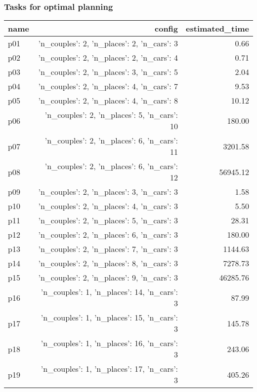 \documentclass{article}
\begin{document}
                                \subsubsection*{Tasks for optimal planning}
                                
                            \begin{center}
                            \scriptsize
                            \begin{tabular}{@{}l|r|r@{}}
                            name & config & estimated\_time\\\midrule
                              p01&{'n\_couples': 2, 'n\_places': 2, 'n\_cars': 3}&0.66\\
  p02&{'n\_couples': 2, 'n\_places': 2, 'n\_cars': 4}&0.71\\
  p03&{'n\_couples': 2, 'n\_places': 3, 'n\_cars': 5}&2.04\\
  p04&{'n\_couples': 2, 'n\_places': 4, 'n\_cars': 7}&9.53\\
  p05&{'n\_couples': 2, 'n\_places': 4, 'n\_cars': 8}&10.12\\
  p06&{'n\_couples': 2, 'n\_places': 5, 'n\_cars': 10}&180.00\\
  p07&{'n\_couples': 2, 'n\_places': 6, 'n\_cars': 11}&3201.58\\
  p08&{'n\_couples': 2, 'n\_places': 6, 'n\_cars': 12}&56945.12\\
  p09&{'n\_couples': 2, 'n\_places': 3, 'n\_cars': 3}&1.58\\
  p10&{'n\_couples': 2, 'n\_places': 4, 'n\_cars': 3}&5.50\\
  p11&{'n\_couples': 2, 'n\_places': 5, 'n\_cars': 3}&28.31\\
  p12&{'n\_couples': 2, 'n\_places': 6, 'n\_cars': 3}&180.00\\
  p13&{'n\_couples': 2, 'n\_places': 7, 'n\_cars': 3}&1144.63\\
  p14&{'n\_couples': 2, 'n\_places': 8, 'n\_cars': 3}&7278.73\\
  p15&{'n\_couples': 2, 'n\_places': 9, 'n\_cars': 3}&46285.76\\
  p16&{'n\_couples': 1, 'n\_places': 14, 'n\_cars': 3}&87.99\\
  p17&{'n\_couples': 1, 'n\_places': 15, 'n\_cars': 3}&145.78\\
  p18&{'n\_couples': 1, 'n\_places': 16, 'n\_cars': 3}&243.06\\
  p19&{'n\_couples': 1, 'n\_places': 17, 'n\_cars': 3}&405.26\\

\end{tabular}
\end{center}
\end{document}
